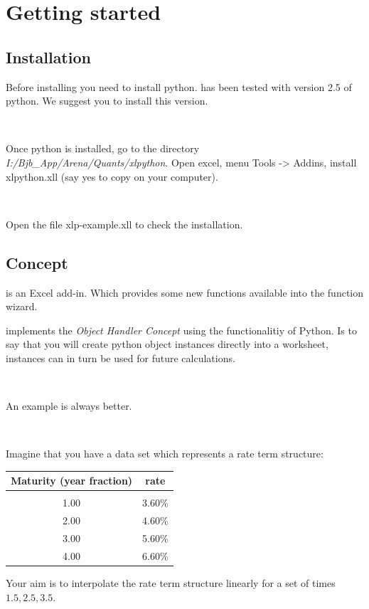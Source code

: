 
\chapter{Getting started}

\section{Installation}

Before installing \xlp you need to install python. \xlp has been tested with version 2.5 of python. We suggest you to install this version.

\

Once python is installed, go to the directory {\it I:/Bjb\_App/Arena/Quants/xlpython}. Open excel, menu Tools -> Addins, install xlpython.xll (say yes to copy on your computer). 

\

Open the file xlp-example.xll to check the installation. 

\section{\xlp Concept}


\xlp is an Excel add-in. Which provides some new functions available into the function wizard. 

\xlp implements the  {\it Object Handler Concept} using the functionalitiy of Python. Is to say that you will create python object instances directly into a worksheet, instances can in turn be used for future calculations.

\

An example is always better.

\

Imagine that you have a data set which represents a rate term structure:

\begin{center}
\begin{tabular}{c|c}
\bf{Maturity (year fraction)} & rate \\
\hline\\
1.00 & 3.60\% \\
2.00 & 4.60\% \\
3.00 & 5.60\% \\
4.00 & 6.60\% 
\end{tabular}
\end{center}

Your aim is to interpolate the rate term structure linearly for a set of times ${1.5, 2.5, 3.5}$.

